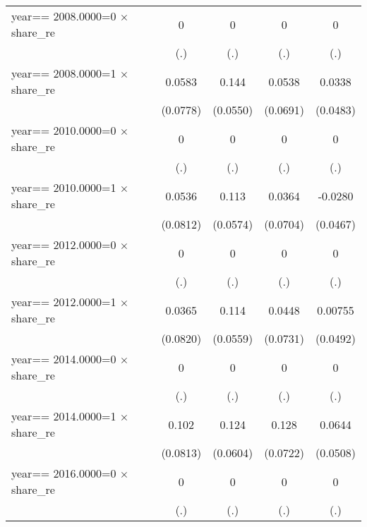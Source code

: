 \begin{table}[htbp]
\begin{tabular}{l*{4}{c}}
year==  2008.0000=0 $\times$ share\_re&        0         &        0         &        0         &        0         \\
                &      (.)         &      (.)         &      (.)         &      (.)         \\
year==  2008.0000=1 $\times$ share\_re&   0.0583         &    0.144\sym{***}&   0.0538         &   0.0338         \\
                & (0.0778)         & (0.0550)         & (0.0691)         & (0.0483)         \\
year==  2010.0000=0 $\times$ share\_re&        0         &        0         &        0         &        0         \\
                &      (.)         &      (.)         &      (.)         &      (.)         \\
year==  2010.0000=1 $\times$ share\_re&   0.0536         &    0.113\sym{**} &   0.0364         &  -0.0280         \\
                & (0.0812)         & (0.0574)         & (0.0704)         & (0.0467)         \\
year==  2012.0000=0 $\times$ share\_re&        0         &        0         &        0         &        0         \\
                &      (.)         &      (.)         &      (.)         &      (.)         \\
year==  2012.0000=1 $\times$ share\_re&   0.0365         &    0.114\sym{**} &   0.0448         &  0.00755         \\
                & (0.0820)         & (0.0559)         & (0.0731)         & (0.0492)         \\
year==  2014.0000=0 $\times$ share\_re&        0         &        0         &        0         &        0         \\
                &      (.)         &      (.)         &      (.)         &      (.)         \\
year==  2014.0000=1 $\times$ share\_re&    0.102         &    0.124\sym{**} &    0.128\sym{*}  &   0.0644         \\
                & (0.0813)         & (0.0604)         & (0.0722)         & (0.0508)         \\
year==  2016.0000=0 $\times$ share\_re&        0         &        0         &        0         &        0         \\
                &      (.)         &      (.)         &      (.)         &      (.)         \\

\end{tabular}
\end{table}

